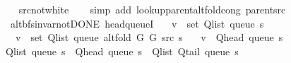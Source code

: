 \begin{isabellebody}
%
\isadelimproof
\ \ %
\endisadelimproof
%
\isatagproof
{}\isamarkupfalse%
\ src{\isacharunderscore}{\kern0pt}not{\isacharunderscore}{\kern0pt}white\isanewline
\ \ \isamarkupfalse%
\ {\isacharparenleft}{\kern0pt}simp\ add{\isacharcolon}{\kern0pt}\ lookup{\isacharunderscore}{\kern0pt}parent{\isacharunderscore}{\kern0pt}alt{\isacharunderscore}{\kern0pt}fold{\isacharunderscore}{\kern0pt}cong\ parent{\isacharunderscore}{\kern0pt}src{\isacharparenright}{\kern0pt}%
\endisatagproof
{\isafoldproof}%
%
\isadelimproof
%
\endisadelimproof
%
\isadelimdocument
%
\endisadelimdocument
%
\isatagdocument
%
\isamarkuptrue%
%
\endisatagdocument
{\isafolddocument}%
%
\isadelimdocument
%
\endisadelimdocument
{}\isamarkupfalse%
\ {\isacharparenleft}{\kern0pt}\ alt{\isacharunderscore}{\kern0pt}bfs{\isacharunderscore}{\kern0pt}invar{\isacharunderscore}{\kern0pt}not{\isacharunderscore}{\kern0pt}DONE{\isacharparenright}{\kern0pt}\ head{\isacharunderscore}{\kern0pt}queueI{\isacharcolon}{\kern0pt}\isanewline
\ \ \ {\isachardoublequoteopen}v\ {\isasymin}\ set\ {\isacharparenleft}{\kern0pt}Q{\isacharunderscore}{\kern0pt}list\ {\isacharparenleft}{\kern0pt}queue\ s{\isacharparenright}{\kern0pt}{\isacharparenright}{\kern0pt}{\isachardoublequoteclose}\isanewline
\ \ \ {\isachardoublequoteopen}v\ {\isasymnotin}\ set\ {\isacharparenleft}{\kern0pt}Q{\isacharunderscore}{\kern0pt}list\ {\isacharparenleft}{\kern0pt}queue\ {\isacharparenleft}{\kern0pt}alt{\isacharunderscore}{\kern0pt}fold\ G{}\ G{}\ src\ s{\isacharparenright}{\kern0pt}{\isacharparenright}{\kern0pt}{\isacharparenright}{\kern0pt}{\isachardoublequoteclose}\isanewline
\ \ \ {\isachardoublequoteopen}v\ {\isacharequal}{\kern0pt}\ Q{\isacharunderscore}{\kern0pt}head\ {\isacharparenleft}{\kern0pt}queue\ s{\isacharparenright}{\kern0pt}{\isachardoublequoteclose}\isanewline
%
\isadelimproof
%
\endisadelimproof
%
\isatagproof
{}\isamarkupfalse%
\ {\isacharminus}{\kern0pt}\isanewline
\ \ \isamarkupfalse%
\ {\isachardoublequoteopen}Q{\isacharunderscore}{\kern0pt}list\ {\isacharparenleft}{\kern0pt}queue\ s{\isacharparenright}{\kern0pt}\ {\isacharequal}{\kern0pt}\ Q{\isacharunderscore}{\kern0pt}head\ {\isacharparenleft}{\kern0pt}queue\ s{\isacharparenright}{\kern0pt}\ {\isacharhash}{\kern0pt}\ Q{\isacharunderscore}{\kern0pt}list\ {\isacharparenleft}{\kern0pt}Q{\isacharunderscore}{\kern0pt}tail\ {\isacharparenleft}{\kern0pt}queue\ s{\isacharparenright}{\kern0pt}{\isacharparenright}{\kern0pt}{\isachardoublequoteclose}\isanewline

\end{isabellebody}
